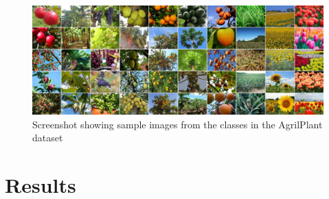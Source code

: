 \documentclass[conference]{IEEEtran}
\begin{document}
    \begin{figure}
    
        \centerline{\includegraphics[width=1\textwidth]{figures/agrilplant-image.jpeg}}
        \caption{Screenshot showing sample images from the classes in the AgrilPlant dataset \cite{pawara2017comparing}}

        \label{fig:agrilplant}
    \end{figure}
    
        

\section{Results}
\end{document}
